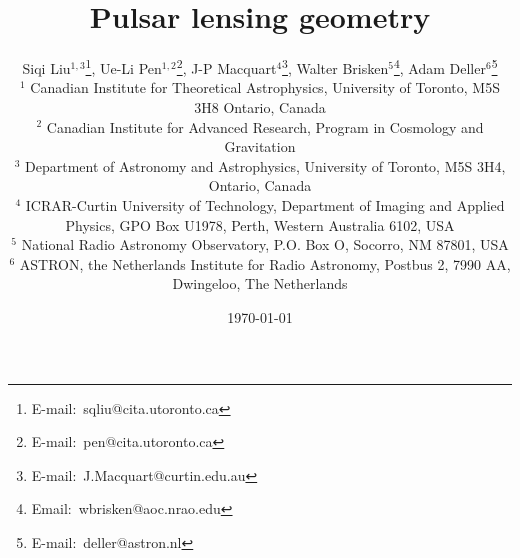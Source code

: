 \documentclass[useAMS,usenatbib]{mn2e}
\begin{document}
\title[Lensing geometry]{
Pulsar lensing geometry
}

\author[Liu et al]{Siqi Liu$^{1,3}$\thanks{E-mail:\ sqliu@cita.utoronto.ca}, Ue-Li
  Pen$^{1,2}$\thanks{E-mail:\ pen@cita.utoronto.ca}, J-P Macquart$^{4}$\thanks{E-mail:\ J.Macquart@curtin.edu.au},
  Walter Brisken$^{5}$\thanks{Email:\ wbrisken@aoc.nrao.edu}, Adam Deller$^{6}$\thanks{E-mail:\ deller@astron.nl}\\
 $^1$ Canadian Institute for Theoretical Astrophysics, University of Toronto, M5S 3H8 Ontario, Canada \\
$^2$ Canadian Institute for Advanced Research, Program in Cosmology
and Gravitation\\
$^3$ Department of Astronomy and Astrophysics, University of Toronto, M5S 3H4, Ontario, Canada\\
$^4$ ICRAR-Curtin University of Technology, Department of Imaging and Applied Physics, GPO Box U1978, Perth, Western Australia 6102, USA \\
$^5$ National Radio Astronomy Observatory, P.O. Box O, Socorro, NM 87801, USA\\
$^6$ ASTRON, the Netherlands Institute for Radio Astronomy, Postbus 2, 7990 AA, Dwingeloo, The Netherlands\\
}

\date{\today}

\pagerange{\pageref{firstpage}--\pageref{lastpage}} 
\end{document}
